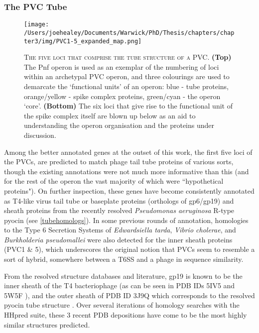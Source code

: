 \subsubsection{The PVC Tube}
\begin{figure}[h!]
\texttt{[image: /Users/joehealey/Documents/Warwick/PhD/Thesis/chapters/chapter3/img/PVC1-5\_expanded\_map.png]}
	\captionsetup{singlelinecheck=off, justification=justified, font=footnotesize, aboveskip=10pt}
	\caption[Tube protein region of a PVC operon]{\textsc{\normalsize The five loci that comprise the tube structure of a PVC.}\vspace{0.1cm} \newline \textbf{(Top)} The Pnf operon is used as an exemplar of the numbering of loci within an archetypal PVC operon, and three colourings are used to demarcate the `functional units' of an operon: blue - tube proteins, orange/yellow - spike complex proteins, green/cyan - the operon `core'. \textbf{(Bottom)} The six loci that give rise to the functional unit of the spike complex itself are blown up below as an aid to understanding the operon organisation and the proteins under discussion.}
	\label{PVC1-5map}
\end{figure}


Among the better annotated genes at the outset of this work, the first five loci of the PVCs, are predicted to match phage tail tube proteins of various sorts, though the existing annotations were not much more informative than this (and for the rest of the operon the vast majority of which were ``hypothetical proteins"). On further inspection, these genes have become consistently annotated as T4-like virus tail tube or baseplate proteins (orthologs of gp6/gp19) and sheath proteins from the recently resolved \emph{Pseudomonas aeruginosa} R-type pyocin (see \vref{tubehomologs}). In some previous rounds of annotation, homologies to the Type 6 Secretion Systems of \emph{Edwardsiella tarda}, \emph{Vibrio cholerae}, and \emph{Burkholderia pseudomallei} were also detected for the inner sheath proteins (PVC1 \& 5), which underscores the original notion that PVCs seem to resemble a sort of hybrid, somewhere between a T6SS and a phage in sequence similarity.

From the resolved structure databases and literature, gp19 is known to be the inner sheath of the T4 bacteriophage (as can be seen in PDB IDs 5IV5 and 5W5F \citep{Taylor2016, Zheng2017}), and the outer sheath of PDB ID 3J9Q which corresponds to the resolved pyocin tube structure \citep{Ge2015}. Over several iterations of homology searches with the HHpred suite, these 3 recent PDB depositions have come to be the most highly similar structures predicted.

